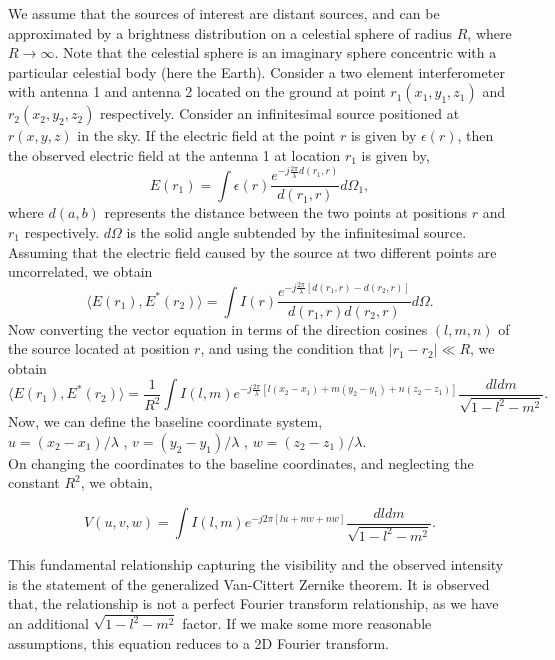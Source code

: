 We assume that the sources of interest are distant sources, and can be approximated by a brightness distribution on a celestial sphere of radius $R$, where $R \rightarrow \infty$. Note that the celestial sphere is an imaginary sphere concentric with a particular celestial body (here the Earth).
Consider a two element interferometer with antenna 1 and antenna 2 located on the ground at point $r_1(x_1,y_1,z_1)$ and $r_2(x_2,y_2,z_2)$ respectively.
Consider an infinitesimal source positioned at $r(x,y,z)$ in the sky. If the electric field at the point $r$ is given by $\epsilon(r)$, then the observed electric field at the 
antenna 1 at location $r_1$ is given by,
\begin{equation}
 E(r_1) = \int \epsilon(r) \frac{e^{- j\frac{2\pi}{\lambda} d(r_1,r)}}{d(r_1,r)} d\Omega_1,
\end{equation}
where $d(a,b)$ represents the distance between the two points at positions $r$ and $r_1$ respectively. $d\Omega$ is the solid angle subtended by the infinitesimal source.
Assuming that the electric field caused by the source at two different points are uncorrelated, we obtain
\begin{equation}
 \langle E(r_1),E^*(r_2)\rangle = \int {I}(r) \frac{e^{- j\frac{2\pi}{\lambda} [ d(r_1,r) - d(r_2,r)]}}{d(r_1,r)d(r_2,r)} d\Omega.
\end{equation}
Now converting the vector equation in terms of the direction cosines $(l,m,n)$ of the source located at position $r$,  and using the condition that $ |r_1 -r_2 | \ll R$,  we obtain
\begin{equation}
 \langle E(r_1),E^*(r_2)\rangle  = \frac{1}{R^2}\int {I}(l,m) {e^{- j\frac{2\pi}{\lambda} [l(x_2-x_1) + m(y_2-y_1) + n(z_2-z_1)]}} {\frac{dl dm}{\sqrt{1-l^2-m^2}}}. 
\end{equation}
Now, we can define the baseline coordinate system, \\
$u = (x_2-x_1)/\lambda$ , $v = (y_2-y_1)/\lambda$ , $w = (z_2-z_1)/\lambda$.\\
On changing the coordinates to the baseline coordinates, and neglecting the constant $R^2$, we obtain,

\begin{equation}
{V}(u,v,w)  = \int {I}(l,m) {e^{- j{2\pi} [lu + mv + nw]}} {\frac{dl dm}{\sqrt{1-l^2-m^2}}}. 
\end{equation}

This fundamental relationship capturing the visibility and the observed intensity is the statement of the generalized Van-Cittert Zernike theorem.
It is observed that, the relationship is not a perfect Fourier transform relationship, as we have an additional $\sqrt{1-l^2-m^2}$  factor.
If we make some more reasonable assumptions, this equation reduces to a 2D Fourier transform.

